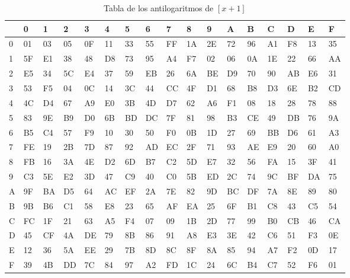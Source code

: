 \begin{table}[!htb]
    \begin{adjustwidth}{-.8in}{-.8in}  
\begin{tabular}{|l|l|l|l|l|l|l|l|l|l|l|l|l|l|l|l|l|}
\hline
\multicolumn{1}{|r|}{} & 0  & 1  & 2  & 3  & 4  & 5  & 6  & 7  & 8  & 9  & A  & B  & C  & D  & E  & F  \\ \hline
0                      & 01 & 03 & 05 & 0F & 11 & 33 & 55 & FF & 1A & 2E & 72 & 96 & A1 & F8 & 13 & 35 \\ \hline
1                      & 5F & E1 & 38 & 48 & D8 & 73 & 95 & A4 & F7 & 02 & 06 & 0A & 1E & 22 & 66 & AA \\ \hline
2                      & E5 & 34 & 5C & E4 & 37 & 59 & EB & 26 & 6A & BE & D9 & 70 & 90 & AB & E6 & 31 \\ \hline
3                      & 53 & F5 & 04 & 0C & 14 & 3C & 44 & CC & 4F & D1 & 68 & B8 & D3 & 6E & B2 & CD \\ \hline
4                      & 4C & D4 & 67 & A9 & E0 & 3B & 4D & D7 & 62 & A6 & F1 & 08 & 18 & 28 & 78 & 88 \\ \hline
5                      & 83 & 9E & B9 & D0 & 6B & BD & DC & 7F & 81 & 98 & B3 & CE & 49 & DB & 76 & 9A \\ \hline
6                      & B5 & C4 & 57 & F9 & 10 & 30 & 50 & F0 & 0B & 1D & 27 & 69 & BB & D6 & 61 & A3 \\ \hline
7                      & FE & 19 & 2B & 7D & 87 & 92 & AD & EC & 2F & 71 & 93 & AE & E9 & 20 & 60 & A0 \\ \hline
8                      & FB & 16 & 3A & 4E & D2 & 6D & B7 & C2 & 5D & E7 & 32 & 56 & FA & 15 & 3F & 41 \\ \hline
9                      & C3 & 5E & E2 & 3D & 47 & C9 & 40 & C0 & 5B & ED & 2C & 74 & 9C & BF & DA & 75 \\ \hline
A                      & 9F & BA & D5 & 64 & AC & EF & 2A & 7E & 82 & 9D & BC & DF & 7A & 8E & 89 & 80 \\ \hline
B                      & 9B & B6 & C1 & 58 & E8 & 23 & 65 & AF & EA & 25 & 6F & B1 & C8 & 43 & C5 & 54 \\ \hline
C                      & FC & 1F & 21 & 63 & A5 & F4 & 07 & 09 & 1B & 2D & 77 & 99 & B0 & CB & 46 & CA \\ \hline
D                      & 45 & CF & 4A & DE & 79 & 8B & 86 & 91 & A8 & E3 & 3E & 42 & C6 & 51 & F3 & 0E \\ \hline
E                      & 12 & 36 & 5A & EE & 29 & 7B & 8D & 8C & 8F & 8A & 85 & 94 & A7 & F2 & 0D & 17 \\ \hline
F                      & 39 & 4B & DD & 7C & 84 & 97 & A2 & FD & 1C & 24 & 6C & B4 & C7 & 52 & F6 & 01 \\ \hline
\end{tabular}
	\label{potencias}
	\end{adjustwidth}
\caption{Tabla de los antilogaritmos de $[x+1]$}
\end{table}
